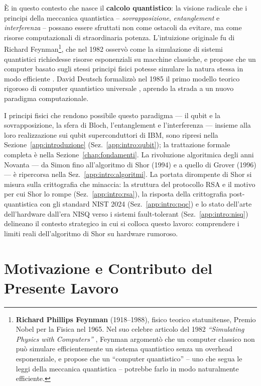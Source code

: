 \begin{onehalfspace}
È in questo contesto che nasce il \textbf{calcolo quantistico}: la visione radicale che i principi della meccanica quantistica -- \textit{sovrapposizione}, \textit{entanglement} e \textit{interferenza} -- possano essere sfruttati non come ostacoli da evitare, ma come risorse computazionali di straordinaria potenza. L'intuizione originale fu di Richard Feynman\footnote{\textbf{Richard Phillips Feynman} (1918--1988), fisico teorico statunitense, Premio Nobel per la Fisica nel 1965. Nel suo celebre articolo del 1982 \textit{``Simulating Physics with Computers''} \cite{feynman1982}, Feynman argomentò che un computer classico non può simulare efficientemente un sistema quantistico senza un overhead esponenziale, e propose che un ``computer quantistico'' -- uno che segua le leggi della meccanica quantistica -- potrebbe farlo in modo naturalmente efficiente.}, che nel 1982 osservò come la simulazione di sistemi quantistici richiedesse risorse esponenziali su macchine classiche, e propose che un computer basato sugli stessi principi fisici potesse simulare la natura stessa in modo efficiente \cite{feynman1982}. David Deutsch formalizzò nel 1985 il primo modello teorico rigoroso di computer quantistico universale \cite{deutsch1985}, aprendo la strada a un nuovo paradigma computazionale.

I principi fisici che rendono possibile questo paradigma --- il qubit e la sovrapposizione, la sfera di Bloch, l'entanglement e l'interferenza --- insieme alla loro realizzazione sui qubit superconduttori di IBM, sono ripresi nella Sezione~\ref{app:introduzione} (Sez.~\ref{app:intro:qubit}); la trattazione formale completa è nella Sezione~\ref{chap:fondamenti}. La rivoluzione algoritmica degli anni Novanta --- da Simon fino all'algoritmo di Shor (1994) e a quello di Grover (1996) --- è ripercorsa nella Sez.~\ref{app:intro:algoritmi}. La portata dirompente di Shor si misura sulla crittografia che minaccia: la struttura del protocollo RSA e il motivo per cui Shor lo rompe (Sez.~\ref{app:intro:rsa}), la risposta della crittografia post-quantistica con gli standard NIST 2024 (Sez.~\ref{app:intro:pqc}) e lo stato dell'arte dell'hardware dall'era NISQ verso i sistemi fault-tolerant (Sez.~\ref{app:intro:nisq}) delineano il contesto strategico in cui si colloca questo lavoro: comprendere i limiti reali dell'algoritmo di Shor su hardware rumoroso.
\section{Motivazione e Contributo del Presente Lavoro}


\end{onehalfspace}
